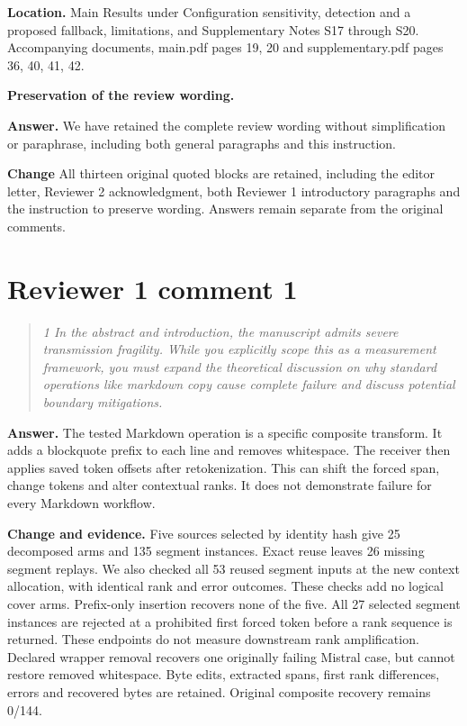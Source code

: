 \documentclass[11pt]{article}
\newenvironment{reviewcomment}{\begin{quote}\color{commentgray}\itshape}{\end{quote}}
\begin{document}
\textbf{Location.} Main Results under Configuration sensitivity, detection and a proposed fallback, limitations, and Supplementary Notes S17 through S20. Accompanying documents, main.pdf pages 19, 20 and supplementary.pdf pages 36, 40, 41, 42.


\textbf{Preservation of the review wording.}

\textbf{Answer.} We have retained the complete review wording without simplification or paraphrase, including both general paragraphs and this instruction.

\textbf{Change} All thirteen original quoted blocks are retained, including the editor letter, Reviewer 2 acknowledgment, both Reviewer 1 introductory paragraphs and the instruction to preserve wording. Answers remain separate from the original comments.




\section*{Reviewer 1 comment 1}\label{resp:R1-1}
\begin{reviewcomment}
1 In the abstract and introduction, the manuscript admits severe transmission fragility. While you explicitly scope this as a measurement framework, you must expand the theoretical discussion on why standard operations like markdown copy cause complete failure and discuss potential boundary mitigations.
\end{reviewcomment}

\textbf{Answer.} The tested Markdown operation is a specific composite transform. It adds a blockquote prefix to each line and removes whitespace. The receiver then applies saved token offsets after retokenization. This can shift the forced span, change tokens and alter contextual ranks. It does not demonstrate failure for every Markdown workflow.

\textbf{Change and evidence.} Five sources selected by identity hash give 25 decomposed arms and 135 segment instances. Exact reuse leaves 26 missing segment replays. We also checked all 53 reused segment inputs at the new context allocation, with identical rank and error outcomes. These checks add no logical cover arms. Prefix-only insertion recovers none of the five. All 27 selected segment instances are rejected at a prohibited first forced token before a rank sequence is returned. These endpoints do not measure downstream rank amplification. Declared wrapper removal recovers one originally failing Mistral case, but cannot restore removed whitespace. Byte edits, extracted spans, first rank differences, errors and recovered bytes are retained. Original composite recovery remains 0/144.
\end{document}
